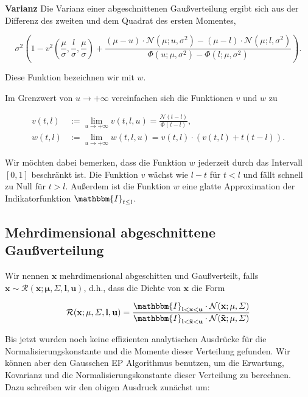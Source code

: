 \documentclass[12pt,a4paper]{scrartcl}
\numberwithin{equation}{section}
\begin{document}
\textbf{Varianz	} Die Varianz einer abgeschnittenen Gaußverteilung ergibt sich aus der Differenz des zweiten und dem Quadrat des ersten Momentes, 

\begin{equation}
 \sigma^2 \left ( 1 - v^2 \left( \frac{\mu}{\sigma}, \frac{l}{\sigma}, \frac{\mu}{\sigma} \right) + \frac{(\mu - u) \cdot \mathcal{N}(\mu; u, \sigma^2) - (\mu - l) \cdot \mathcal{N}(\mu;l,\sigma^2)}{\Phi(u;\mu, \sigma^2) - \Phi(l; \mu, \sigma^2)}\right ).
\end{equation}

Diese Funktion bezeichnen wir mit $w$.

Im Grenzwert von $ u \rightarrow + \infty$ vereinfachen sich die Funktionen $v$ und $w$ zu

\begin{equation}
 \begin{split}
  v(t,l) &:= \lim_{u \rightarrow + \infty} v(t,l,u) = \frac{\mathcal{N}(t-l)}{\Phi(t-l)}, \\
  w(t,l) &:= \lim_{u \rightarrow + \infty} w(t,l,u) = v(t,l) \cdot (v(t,l) + t(t-l)).
 \end{split}
\end{equation}

Wir möchten dabei bemerken, dass die Funktion $w$ jederzeit durch das Intervall $[0,1]$ beschränkt ist. 
Die Funktion $v$ wächst wie $l-t$ für $t<l$ und fällt schnell zu Null für $t > l$. Außerdem ist die Funktion
$w$ eine glatte Approximation der Indikatorfunktion $\mathbbm{I}_{t \leq l}$.

\subsection{Mehrdimensional abgeschnittene Gaußverteilung}

Wir nennen $\mathbf{x}$ mehrdimensional abgeschitten und Gaußverteilt, falls 
$\mathbf{x \sim \mathcal{R}(x;\mu,\varSigma,l,u)} $, d.h., dass die Dichte von $\mathbf{x}$ die Form

\begin{equation}
 \mathcal{R}(\mathbf{x; \mu, \varSigma, l,u}) = \frac{ \mathbbm{I}_{\mathbf{l<x<u}} \cdot \mathcal{N}(\mathbf{x;\mu,\varSigma})}{ \mathbbm{I}_{\mathbf{l< \tilde x <u}} \cdot \mathcal{N}(\mathbf{\tilde x;\mu,\varSigma})}
\end{equation}

Bis jetzt wurden noch keine effizienten analytischen Ausdrücke für die Normalisierungskonstante und die Momente dieser
Verteilung gefunden. Wir können aber den Gausschen EP Algorithmus benutzen, um die Erwartung, Kovarianz und die Normalisierungskonstante
dieser Verteilung zu berechnen. Dazu schreiben wir den obigen Ausdruck zunächst um: 
\end{document}
